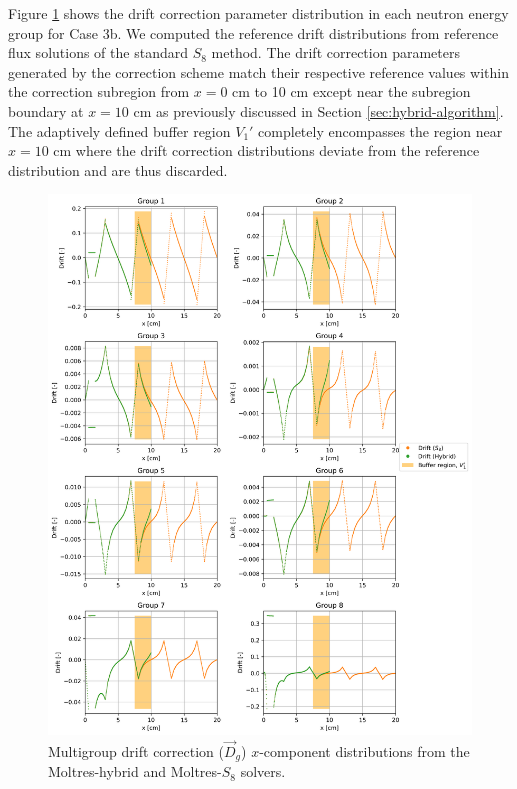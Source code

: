 \documentclass[letterpaper]{mc2025}
\begin{document}
Figure \ref{fig:3b-drift} shows the drift correction parameter distribution in each neutron energy
group for Case 3b. We computed the reference drift distributions from reference flux
solutions of the standard $S_8$ method.
The drift correction parameters generated by the correction scheme match their respective reference
values within the correction subregion from $x=0$ cm to 10 cm except near the subregion boundary at
$x=10$ cm as previously discussed in Section \ref{sec:hybrid-algorithm}. The adaptively defined
buffer region $V_1'$ completely encompasses the region near $x=10$ cm where the drift correction
distributions deviate from the reference distribution and are thus discarded.

\begin{figure}[htb!]
  \centering
  \includegraphics[width=\columnwidth]{case-3b-drift}
  \caption{Multigroup drift correction ($\vec{D}_g$) $x$-component distributions from the
  Moltres-hybrid and Moltres-$S_8$ solvers.}
  \label{fig:3b-drift}
\end{figure}
\end{document}
